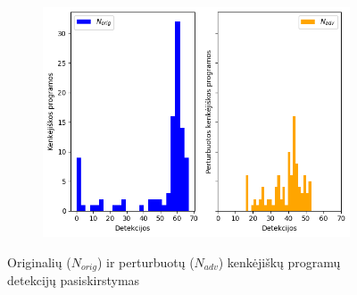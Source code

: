 \begin{figure}[h]
\begin{small}
\begin{center}
\begin{subfigure}[t]{0.48\textwidth}
                \includegraphics[width=\textwidth]{img/det_distributions.png}
            \end{subfigure}
        \end{center}
        \caption{Originalių ($N_{orig}$) ir perturbuotų ($N_{adv}$) kenkėjiškų programų detekcijų pasiskirstymas}\label{fig:experiment:det_dist}
    \end{small}
\end{figure}
